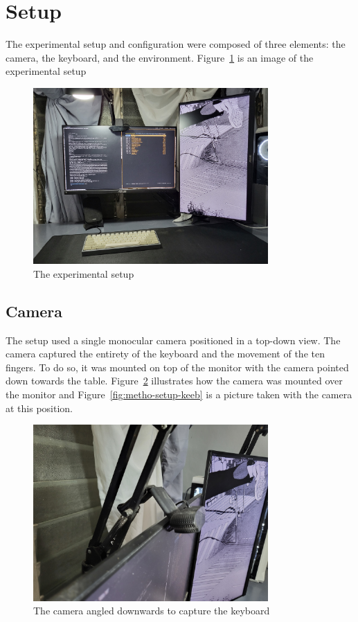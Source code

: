\documentclass{report}
\begin{document}
\section{Setup}
\label{section:metho-setup}

The experimental setup and configuration were composed of three elements: the
camera, the keyboard, and the environment. Figure~\ref{fig:metho-setup} is an
image of the experimental setup


\begin{figure}[H]
	\centering
	\includegraphics[width=0.8\textwidth]{full-setup.jpg}
	\caption{The experimental setup}
	\label{fig:metho-setup}
	\centering
\end{figure}

\subsection{Camera}
The setup used a single monocular camera positioned in a top-down view. The
camera captured the entirety of the keyboard and the movement of the ten
fingers. To do so, it was mounted on top of the monitor with the camera pointed
down towards the table. Figure~\ref{fig:metho-setup-camera-placement}
illustrates how the camera was mounted over the monitor and
Figure~\ref{fig:metho-setup-keeb} is a picture taken with the camera at this
position.

\begin{figure}[H]
	\centering
	\includegraphics[width=0.8\textwidth]{camera-placement.jpg}
	\caption{The camera angled downwards to capture the keyboard}
	\label{fig:metho-setup-camera-placement}
\end{figure}
\end{document}
